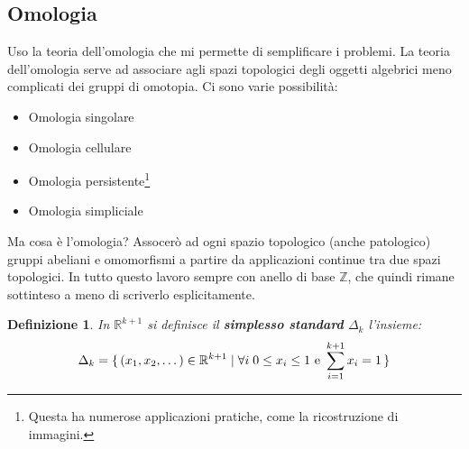 \documentclass[10pt, twoside=false, x11names]{scrbook}
\newtheorem{definition}[theorem]{Definizione}
\newcommand{\Z}{\mathbb{Z}}
\newcommand{\RN}[1][]{\mathbb{R}^#1}
\begin{document}
\subsection{Omologia}

Uso la teoria dell'omologia che mi permette di semplificare i problemi. La teoria
dell'omologia serve ad associare agli spazi topologici degli oggetti algebrici
meno complicati dei gruppi di omotopia.
Ci sono varie possibilità:
\begin{itemize}
  \item Omologia singolare
  \item Omologia cellulare
  \item Omologia persistente\footnote{Questa ha numerose applicazioni pratiche, come la ricostruzione di immagini.}
  \item Omologia simpliciale
\end{itemize}
Ma cosa è l'omologia? Assocerò ad ogni spazio topologico (anche patologico) gruppi abeliani e omomorfismi a partire
da applicazioni continue tra due spazi topologici. In tutto questo lavoro sempre con anello di base $ \Z $, che
quindi rimane sottinteso a meno di scriverlo esplicitamente.

\begin{definition}
  In $ \RN{k+1} $ si definisce il \textbf{simplesso standard} $ \Delta_k $ l'insieme:
  \[
    \Delta_k = \set{(x_1,x_2,\dots) \in \RN{k+1} | \forall i \; 0 \leq x_i \leq 1 \text{ e } \sum_{i=1}^{k+1}x_i = 1}
  \]
\end{definition}
\end{document}
